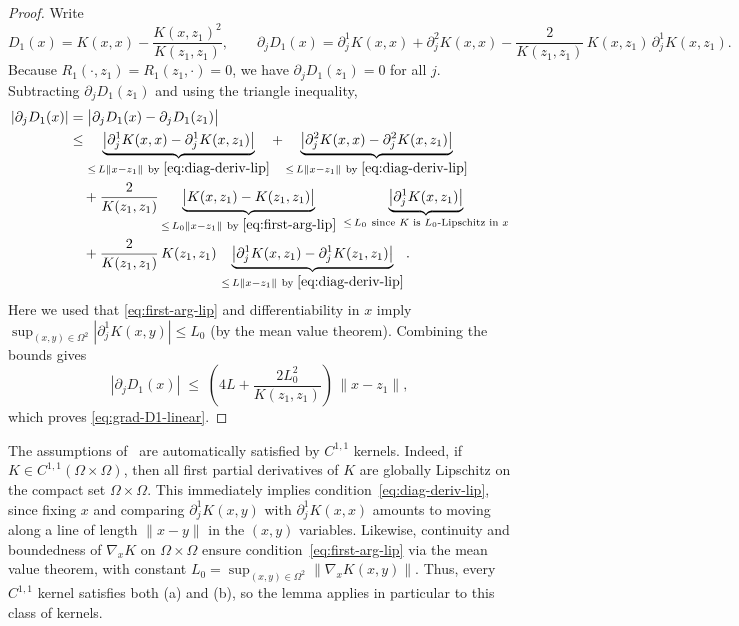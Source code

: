 \documentclass{amsart}
\theoremstyle{definition}
\theoremstyle{remark}
\begin{document}
\begin{proof}
Write
\[
D_1(x)=K(x,x)-\frac{K(x,z_1)^2}{K(z_1,z_1)},\qquad
\partial_j D_1(x)
= \partial_j^1K(x,x)+\partial_j^2K(x,x)
-\frac{2}{K(z_1,z_1)}\,K(x,z_1)\,\partial_j^1K(x,z_1).
\]
Because $R_1(\cdot,z_1)=R_1(z_1,\cdot)=0$, we have $\partial_j D_1(z_1)=0$ for all $j$.
Subtracting $\partial_j D_1(z_1)$ and using the triangle inequality,
\begin{align*}
|\partial_j D_1(x)|
&= \bigl|\partial_j D_1(x)-\partial_j D_1(z_1)\bigr| \\
&\le \underbrace{\bigl|\partial_j^1K(x,x)-\partial_j^1K(x,z_1)\bigr|}_{\le\, L\|x-z_1\|\ \text{by }\eqref{eq:diag-deriv-lip}}
+\underbrace{\bigl|\partial_j^2K(x,x)-\partial_j^2K(x,z_1)\bigr|}_{\le\, L\|x-z_1\|\ \text{by }\eqref{eq:diag-deriv-lip}} \\
&\quad + \frac{2}{K(z_1,z_1)}
\underbrace{\bigl|K(x,z_1)-K(z_1,z_1)\bigr|}_{\le\, L_0\|x-z_1\|\ \text{by }\eqref{eq:first-arg-lip}}
\ \underbrace{\bigl|\partial_j^1K(x,z_1)\bigr|}_{\le\, L_0\ \text{since }K\text{ is }L_0\text{-Lipschitz in }x} \\
&\quad + \frac{2}{K(z_1,z_1)}\,K(z_1,z_1)\,
\underbrace{\bigl|\partial_j^1K(x,z_1)-\partial_j^1K(z_1,z_1)\bigr|}_{\le\, L\|x-z_1\|\ \text{by }\eqref{eq:diag-deriv-lip}}.
\end{align*}
Here we used that \cref{eq:first-arg-lip} and differentiability in $x$ imply
\(
\sup_{(x,y)\in\Omega^2}|\partial_j^{1}K(x,y)|\le L_0
\)
(by the mean value theorem). Combining the bounds gives
\[
|\partial_j D_1(x)| \;\le\; \left(4L + \frac{2L_0^2}{K(z_1,z_1)}\right)\,\|x-z_1\|,
\]
which proves \cref{eq:grad-D1-linear}.
\end{proof}

The assumptions of~ are automatically satisfied by $C^{1,1}$ kernels.  Indeed, if $K\in C^{1,1}(\Omega\times\Omega)$, then all first partial derivatives of $K$ are globally Lipschitz on the compact set $\Omega\times\Omega$.  This immediately implies condition~\cref{eq:diag-deriv-lip}, since fixing $x$ and comparing $\partial_j^1 K(x,y)$ with $\partial_j^1 K(x,x)$ amounts to moving along a line of length $\|x-y\|$ in the $(x,y)$ variables.  Likewise, continuity and boundedness of $\nabla_x K$ on $\Omega\times\Omega$ ensure condition~\cref{eq:first-arg-lip} via the mean value theorem, with constant $L_0=\sup_{(x,y)\in\Omega^2}\|\nabla_x K(x,y)\|$. 
Thus, every $C^{1,1}$ kernel satisfies both (a) and (b), so the lemma applies in particular to this class of kernels. 
\end{document}

